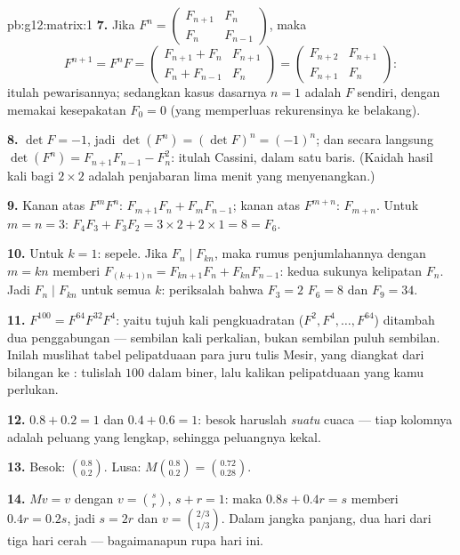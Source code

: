 \begin{solution}{pb:g12:matrix:1}
\textbf{7.} Jika $F^n = \begin{pmatrix} F_{n+1} & F_n\\ F_n &
F_{n-1}\end{pmatrix}$, maka
\[
F^{n+1} = F^n F =
\begin{pmatrix} F_{n+1} + F_n & F_{n+1}\\
F_n + F_{n-1} & F_n \end{pmatrix}
= \begin{pmatrix} F_{n+2} & F_{n+1}\\ F_{n+1} & F_n
\end{pmatrix} :
\]
itulah pewarisannya; sedangkan kasus dasarnya $n = 1$ adalah $F$ sendiri, dengan
memakai kesepakatan $F_0 = 0$ (yang memperluas rekurensinya ke belakang).

\textbf{8.} $\det F = -1$, jadi
$\det(F^n) = (\det F)^n = (-1)^n$; dan secara langsung
$\det(F^n) = F_{n+1}F_{n-1} - F_n^2$: itulah Cassini, dalam satu baris. (Kaidah
hasil kali bagi  $2 \times 2$ adalah penjabaran lima menit
yang menyenangkan.)

\textbf{9.} Kanan atas $F^m F^n$:
$F_{m+1}F_n + F_m F_{n-1}$; kanan atas $F^{m+n}$:
$F_{m+n}$. Untuk $m = n = 3$:
$F_4 F_3 + F_3 F_2 = 3 \times 2 + 2 \times 1 = 8 = F_6$.

\textbf{10.} Untuk $k = 1$: sepele. Jika $F_n \mid F_{kn}$, maka
rumus penjumlahannya dengan $m = kn$ memberi
$F_{(k+1)n} = F_{kn+1}F_n + F_{kn}F_{n-1}$: kedua sukunya
kelipatan $F_n$. Jadi $F_n \mid F_{kn}$ untuk semua $k$: periksalah bahwa
$F_3 = 2$  $F_6 = 8$ dan $F_9 = 34$.

\textbf{11.} $F^{100} = F^{64} F^{32} F^4$: yaitu tujuh kali pengkuadratan
($F^2, F^4, \dots, F^{64}$) ditambah dua penggabungan --- sembilan
kali perkalian, bukan sembilan puluh sembilan. Inilah
muslihat tabel pelipatduaan para juru tulis Mesir, yang diangkat dari
bilangan ke : tulislah $100$ dalam biner, lalu kalikan
pelipatduaan yang kamu perlukan.

\textbf{12.} $0.8 + 0.2 = 1$ dan $0.4 + 0.6 = 1$: besok
haruslah \emph{suatu} cuaca --- tiap kolomnya adalah 
peluang yang lengkap, sehingga peluangnya kekal.

\textbf{13.} Besok: $\binom{0.8}{0.2}$. Lusa:
$M\binom{0.8}{0.2} = \binom{0.72}{0.28}$.

\textbf{14.} $Mv = v$ dengan $v = \binom{s}{r}$, $s + r = 1$:
maka $0.8s + 0.4r = s$ memberi $0.4r = 0.2s$, jadi $s = 2r$ dan
$v = \binom{2/3}{1/3}$. Dalam jangka panjang, dua hari dari tiga hari
cerah --- bagaimanapun rupa hari ini.


\end{solution}
